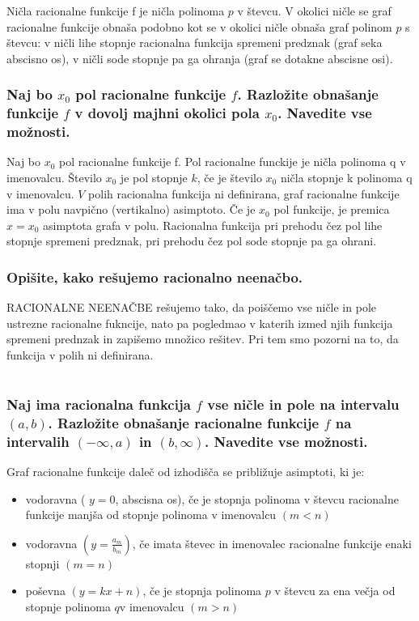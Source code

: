 \documentclass{article}
\begin{document}
Ničla racionalne funkcije f je ničla polinoma $p$ v števcu. V okolici ničle se graf racionalne funkcije obnaša podobno kot se v okolici ničle obnaša graf polinom $p$ s števcu: v ničli lihe stopnje racionalna funkcija spremeni predznak (graf seka abscisno os), v ničli sode stopnje pa ga ohranja (graf se dotakne abscisne osi).

\subsubsection*{Naj bo $x_{0}$ pol racionalne funkcije $f$. Razložite obnašanje funkcije $f$ v dovolj majhni okolici pola $x_{0}$. Navedite vse možnosti.}

Naj bo $x_0$ pol racionalne funkcije f. Pol racionalne funckije je ničla polinoma q v imenovalcu. Število $x_{0}$ je pol stopnje $k$, če je število $x_{0}$ ničla stopnje k polinoma q v imenovalcu. $V$ polih racionalna funkcija ni definirana, graf racionalne funkcije ima v polu navpično (vertikalno) asimptoto. Če je $x_{0}$ pol funkcije, je premica $x=x_{0}$ asimptota grafa v polu. Racionalna funkcija pri prehodu čez pol lihe stopnje spremeni predznak, pri prehodu čez pol sode stopnje pa ga ohrani.

\subsubsection*{Opišite, kako rešujemo racionalno neenačbo.}

RACIONALNE NEENAČBE rešujemo tako, da poiščemo vse ničle in pole ustrezne racionalne fukncije, nato pa pogledmao v katerih izmed njih funkcija spremeni prednzak in zapišemo množico rešitev. Pri tem smo pozorni na to, da funkcija v polih ni definirana.

\section{\texorpdfstring{}{Racionalna funkcija}}
\subsubsection*{Naj ima racionalna funkcija $f$ vse ničle in pole na intervalu $(a, b)$. Razložite obnašanje racionalne funkcije $f$ na intervalih $(-\infty, a)$ in $(b, \infty)$. Navedite vse možnosti.}
Graf racionalne funkcije daleč od izhodišča se približuje asimptoti, ki je:
\begin{itemize}

  \item vodoravna ( $y=0$, abscisna os), če je stopnja polinoma v števcu racionalne funkcije manjša od stopnje polinoma v imenovalcu $(m<n)$

  \item vodoravna $\left(y=\frac{a_{m}}{b_{m}}\right)$, če imata števec in imenovalec racionalne funkcije enaki stopnji $(m=n)$

  \item poševna $(y=k x+n)$, če je stopnja polinoma $p$ v števcu za ena večja od stopnje polinoma $q \mathrm{v}$ imenovalcu $(m>n)$

\end{itemize}
\end{document}
